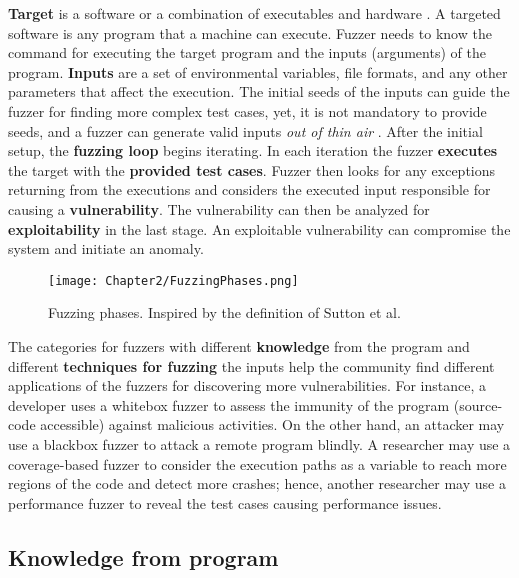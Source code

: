 \textbf{Target} is a software or a combination of executables and hardware \cite{song2019periscope}. A targeted software is any program that a machine can execute. 
Fuzzer needs to know the command for executing the target program and the inputs (arguments) of the program. \textbf{Inputs} are a set of environmental variables, file formats, and any other parameters that affect the execution. The initial seeds of the inputs can guide the fuzzer for finding more complex test cases, yet, it is not mandatory to provide seeds, and a fuzzer can generate valid inputs \textit{out of thin air} \cite{out_of_thin_air}. After the initial setup, the \textbf{fuzzing loop} begins iterating. In each iteration the fuzzer \textbf{executes} the target with the \textbf{provided test cases}. Fuzzer then looks for any exceptions returning from the executions and considers the executed input responsible for causing a \textbf{vulnerability}. The vulnerability can then be analyzed for \textbf{exploitability} in the last stage. An exploitable vulnerability can compromise the system and initiate an anomaly.

\begin{figure}[!b]
  \texttt{[image: Chapter2/FuzzingPhases.png]}
  \centering
  \caption{Fuzzing phases. Inspired by the definition of Sutton et al. \cite{sutton2007fuzzing}}
  \label{fig:fuzz_phases}
\end{figure}

The categories for fuzzers with different \textbf{knowledge} from the program and different \textbf{techniques for fuzzing} the inputs help the community find different applications of the fuzzers for discovering more vulnerabilities. For instance, a developer uses a whitebox fuzzer to assess the immunity of the program (source-code accessible) against malicious activities. On the other hand, an attacker may use a blackbox fuzzer to attack a remote program blindly. A researcher may use a coverage-based fuzzer to consider the execution paths as a variable to reach more regions of the code and detect more crashes; hence, another researcher may use a performance fuzzer to reveal the test cases causing performance issues. 

\subsection{Knowledge from program}


